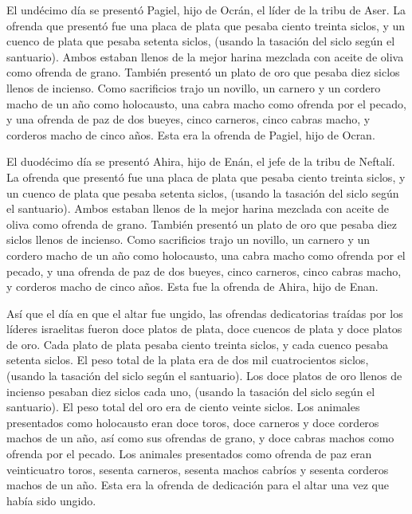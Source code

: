  El undécimo día se presentó Pagiel, hijo de Ocrán, el
líder de la tribu de Aser.  La ofrenda que presentó fue una
placa de plata que pesaba ciento treinta siclos, y un cuenco de plata
que pesaba setenta siclos, (usando la tasación del siclo según el
santuario). Ambos estaban llenos de la mejor harina mezclada con aceite
de oliva como ofrenda de grano.  También presentó un plato
de oro que pesaba diez siclos llenos de incienso. Como sacrificios trajo
 un novillo, un carnero y un cordero macho de un año como
holocausto,  una cabra macho como ofrenda por el pecado,
 y una ofrenda de paz de dos bueyes, cinco carneros, cinco
cabras macho, y corderos macho de cinco años. Esta era la ofrenda de
Pagiel, hijo de Ocran.

 El duodécimo día se presentó Ahira, hijo de Enán, el jefe
de la tribu de Neftalí.  La ofrenda que presentó fue una
placa de plata que pesaba ciento treinta siclos, y un cuenco de plata
que pesaba setenta siclos, (usando la tasación del siclo según el
santuario). Ambos estaban llenos de la mejor harina mezclada con aceite
de oliva como ofrenda de grano.  También presentó un plato
de oro que pesaba diez siclos llenos de incienso. Como sacrificios trajo
 un novillo, un carnero y un cordero macho de un año como
holocausto,  una cabra macho como ofrenda por el pecado,
 y una ofrenda de paz de dos bueyes, cinco carneros, cinco
cabras macho, y corderos macho de cinco años. Esta fue la ofrenda de
Ahira, hijo de Enan.

 Así que el día en que el altar fue ungido, las ofrendas
dedicatorias traídas por los líderes israelitas fueron doce platos de
plata, doce cuencos de plata y doce platos de oro.  Cada
plato de plata pesaba ciento treinta siclos, y cada cuenco pesaba
setenta siclos. El peso total de la plata era de dos mil cuatrocientos
siclos, (usando la tasación del siclo según el santuario). 
Los doce platos de oro llenos de incienso pesaban diez siclos cada uno,
(usando la tasación del siclo según el santuario). El peso total del oro
era de ciento veinte siclos.  Los animales presentados como
holocausto eran doce toros, doce carneros y doce corderos machos de un
año, así como sus ofrendas de grano, y doce cabras machos como ofrenda
por el pecado.  Los animales presentados como ofrenda de
paz eran veinticuatro toros, sesenta carneros, sesenta machos cabríos y
sesenta corderos machos de un año. Esta era la ofrenda de dedicación
para el altar una vez que había sido ungido.

